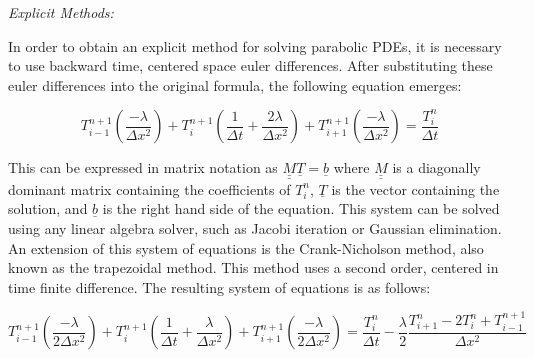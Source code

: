 \documentclass{article}
\begin{document}
      
      \bigbreak    
      \textit{Explicit Methods:}
      
      In order to obtain an explicit method for solving parabolic PDEs, it is necessary to use backward time, centered space euler differences.  After substituting these euler differences into the original formula, the following equation emerges:
      
      \begin{equation}
      T_{i-1}^{n+1}\left(\frac{-\lambda}{\Delta x^2}\right) + 
      T_{i}^{n+1}\left(\frac{1}{\Delta t} + \frac{2\lambda}{\Delta x^2}\right) +
      T_{i+1}^{n+1}\left(\frac{-\lambda}{\Delta x^2}\right) = \frac{T_{i}^{n}}{\Delta t} 
      \end{equation}
      
      This can be expressed in matrix notation as $\underline{\underline{M}} \underline{T} = \underline{b}$ where $\underline{\underline{M}}$ is a diagonally dominant matrix containing the coefficients of $T_i^n$, $\underline{T}$ is the vector containing the solution, and $\underline{b}$ is the right hand side of the equation. This system can be solved using any linear algebra solver, such as Jacobi iteration or Gaussian elimination. An extension of this system of equations is the Crank-Nicholson method, also known as the trapezoidal method. This method uses a second order, centered in time finite difference. The resulting system of equations is as follows:
  
      \begin{equation}
      T_{i-1}^{n+1}\left(\frac{-\lambda}{2\Delta x^2}\right) + 
      T_{i}^{n+1}\left(\frac{1}{\Delta t} + \frac{\lambda}{\Delta x^2}\right) +
      T_{i+1}^{n+1}\left(\frac{-\lambda}{2\Delta x^2}\right) = 
      \frac{T_{i}^{n}}{\Delta t} - \frac{\lambda}{2}\frac{T_{i+1}^{n}-2T_{i}^{n}+T_{i-1}^{n+1}}{\Delta x^2}
      \end{equation} 
      
    
\end{document}

